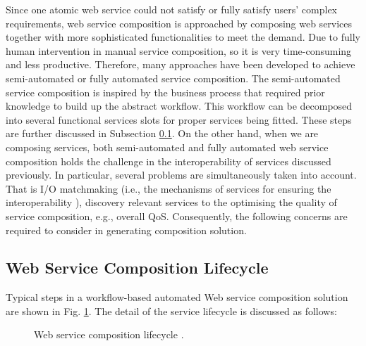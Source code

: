 Since one atomic web service could not satisfy or fully satisfy users' complex requirements, web service composition is approached by composing web services together with more sophisticated functionalities to meet the demand. Due to fully human intervention in manual service composition, so it is very time-consuming and less productive. Therefore, many approaches have been developed to achieve semi-automated or fully automated service composition. The semi-automated service composition is inspired by the business process that required prior knowledge to build up the abstract workflow. This workflow can be decomposed into several functional services slots for proper services being fitted. These steps are further discussed in Subsection \ref{lifecycle}. On the other hand, when we are composing services, both semi-automated and fully automated web service composition holds the challenge in the interoperability of services discussed previously. In particular, several problems are simultaneously taken into account. That is I/O matchmaking (i.e., the mechanisms of services for ensuring the interoperability ), discovery relevant services to the optimising the quality of service composition, e.g., overall QoS. Consequently, the following concerns are required to consider in generating composition solution. 


\subsection{Web Service Composition Lifecycle}\label{lifecycle}
Typical steps in a workflow-based automated Web service composition solution are shown in Fig. \ref{fig:lifecycle}. The detail of the service lifecycle is discussed as follows:

\begin{figure}
\centerline{
}
\caption{ Web service composition lifecycle \cite{moghaddam2014service}.}
\label{fig:lifecycle}
\end{figure}

